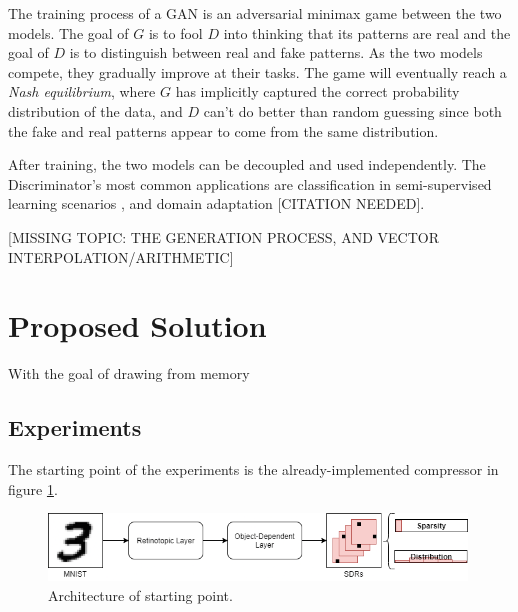 \documentclass{article}
\begin{document}
The training process of a GAN is an adversarial minimax game between the two models. The goal of $G$ is to fool $D$ into thinking that its patterns are real and the goal of $D$ is to distinguish between real and fake patterns. As the two models compete, they gradually improve at their tasks. The game will eventually reach a \textit{Nash equilibrium}, where $G$ has implicitly captured the correct probability distribution of the data, and $D$ can't do better than random guessing since both the fake and real patterns appear to come from the same distribution.

After training, the two models can be decoupled and used independently. The Discriminator's most common applications are classification in semi-supervised learning scenarios \cite{salimans2016improved}, and domain adaptation [CITATION NEEDED].

[MISSING TOPIC: THE GENERATION PROCESS, AND VECTOR INTERPOLATION/ARITHMETIC]

\section{Proposed Solution}
With the goal of drawing from memory
\subsection{Experiments}
The starting point of the experiments is the already-implemented compressor in figure \ref{fig:archi_start}.
\begin{figure}[h]
    \centering
    \includegraphics[width=0.99\textwidth]{introduction/img/archi_start.png}
    \caption{Architecture of starting point.}
\label{fig:archi_start}
\end{figure}
\end{document}

